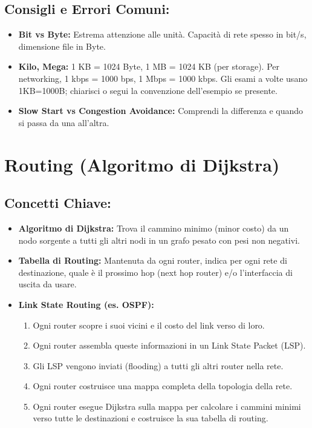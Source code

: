 \subsection{Consigli e Errori Comuni:}
\begin{itemize}
    \item \textbf{Bit vs Byte:} Estrema attenzione alle unità. Capacità di rete spesso in bit/s, dimensione file in Byte.
    \item \textbf{Kilo, Mega:} 1 KB = 1024 Byte, 1 MB = 1024 KB (per storage). Per networking, 1 kbps = 1000 bps, 1 Mbps = 1000 kbps. Gli esami a volte usano 1KB=1000B; chiarisci o segui la convenzione dell'esempio se presente.
    \item \textbf{Slow Start vs Congestion Avoidance:} Comprendi la differenza e quando si passa da una all'altra.
\end{itemize}

\section{Routing (Algoritmo di Dijkstra)}

\subsection{Concetti Chiave:}
\begin{itemize}
    \item \textbf{Algoritmo di Dijkstra:} Trova il cammino minimo (minor costo) da un nodo sorgente a tutti gli altri nodi in un grafo pesato con pesi non negativi.
    \item \textbf{Tabella di Routing:} Mantenuta da ogni router, indica per ogni rete di destinazione, quale è il prossimo hop (next hop router) e/o l'interfaccia di uscita da usare.
    \item \textbf{Link State Routing (es. OSPF):}
    \begin{enumerate}
        \item Ogni router scopre i suoi vicini e il costo del link verso di loro.
        \item Ogni router assembla queste informazioni in un Link State Packet (LSP).
        \item Gli LSP vengono inviati (flooding) a tutti gli altri router nella rete.
        \item Ogni router costruisce una mappa completa della topologia della rete.
        \item Ogni router esegue Dijkstra sulla mappa per calcolare i cammini minimi verso tutte le destinazioni e costruisce la sua tabella di routing.
    \end{enumerate}
\end{itemize}

